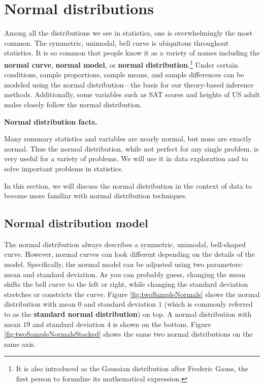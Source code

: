 \documentclass[
  10pt,
  openany]{book}
\theoremstyle{definition}
\theoremstyle{definition}
\theoremstyle{definition}
\theoremstyle{definition}
\theoremstyle{remark}
\begin{document}
\section{Normal distributions}\label{normal}


Among all the distributions we see in statistics, one is overwhelmingly the most common. The symmetric, unimodal, bell curve is ubiquitous throughout statistics. It is so common that people know it as a variety of names including the \textbf{normal curve}, \textbf{normal model}, or \textbf{normal distribution}.\footnote{It is also introduced as the Gaussian distribution after Frederic Gauss, the first person to formalize its mathematical expression.} Under certain conditions, sample proportions, sample means, and sample differences can be modeled using the normal distribution---the basis for our theory-based inference methods. Additionally, some variables such as SAT scores and heights of US adult males closely follow the normal distribution.

\textbf{Normal distribution facts.}

Many summary statistics and variables are nearly normal, but none are exactly normal. Thus the normal distribution, while not perfect for any single problem, is very useful for a variety of problems. We will use it in data exploration and to solve important problems in statistics.

In this section, we will discuss the normal distribution in the context of data to become more familiar with normal distribution techniques.

\subsection{Normal distribution model}\label{normal-distribution-model}

The normal distribution always describes a symmetric, unimodal, bell-shaped curve. However, normal curves can look different depending on the details of the model. Specifically, the normal model can be adjusted using two parameters: mean and standard deviation. As you can probably guess, changing the mean shifts the bell curve to the left or right, while changing the standard deviation stretches or constricts the curve. Figure \ref{fig:twoSampleNormals} shows the normal distribution with mean \(0\) and standard deviation \(1\) (which is commonly referred to as the \textbf{standard normal distribution}) on top. A normal distribution with mean \(19\) and standard deviation \(4\) is shown on the bottom. Figure \ref{fig:twoSampleNormalsStacked} shows the same two normal distributions on the same axis.
\end{document}
